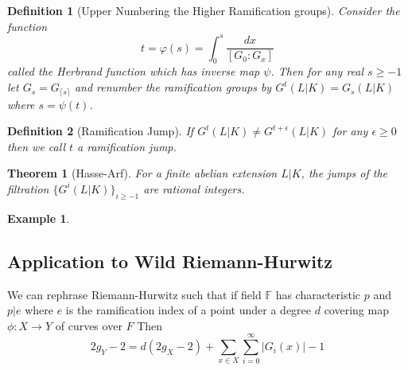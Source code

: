 \documentclass[paper=a4, fontsize=11pt]{scrartcl} %
\numberwithin{equation}{section} %
\numberwithin{figure}{section} %
\numberwithin{table}{section} %
\theoremstyle{break}
\newtheorem{defn}{Definition}
\newtheorem{thm}{Theorem}
\newtheorem{ex}{Example}
\begin{document}
\begin{defn}[Upper Numbering the Higher Ramification groups]
Consider the function
$$
t = \varphi(s) = \int_{0}^{s} \frac{dx}{[G_0 : G_x]}
$$
called the Herbrand function which has inverse map $\psi$.
Then for any real $s \geq -1$ let $G_s = G_{\lceil s \rceil}$ and renumber the ramification groups by $G^t(L|K) = G_s(L|K)$ where $s=\psi(t)$. 
\end{defn}
\begin{defn}[Ramification Jump]
If $G^{t}(L|K) \not=G^{t+\epsilon}(L|K)$ for any $\epsilon \geq 0$ then we call $t$ a ramification jump.
\end{defn}
\begin{thm}[Hasse-Arf]
For a finite abelian extension $L|K$, the jumps of the filtration $\{G^{i}(L|K)\}_{i \geq -1}$ are rational integers.
\end{thm}
\begin{ex}
\end{ex}

\subsection{Application to Wild Riemann-Hurwitz}
We can rephrase Riemann-Hurwitz such that if field $\mathbb{F}$ has characteristic $p$ and $p|e$ where $e$ is the ramification index of a point under a degree $d$ covering map $\phi:X \to Y$ of curves over $F$
Then
$$
2g_Y -2 = d(2g_X -2) + \sum_{x\in X} \sum^{\infty}_{i=0}|G_i(x)| -1
$$
\nocite{*}
\printbibliography
\end{document}
